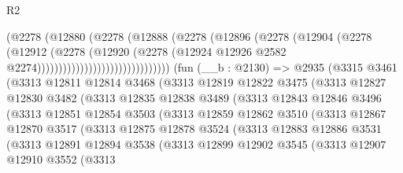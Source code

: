 \begin{lexlean}{R2}
\begin{coremodule}
                                      (@2278
                                        (@12880
                                          (@2278
                                            (@12888
                                              (@2278
                                                (@12896
                                                  (@2278
                                                    (@12904
                                                      (@2278
                                                        (@12912
                                                          (@2278
                                                            (@12920
                                                              (@2278
                                                                (@12924
                                                                  @12926
                                                                  @2582
                                                                  @2274)))))))))))))))))))))))))))))))
    (fun (__b : @2130) =>
    @2935
      (@3315
        @3461
        (@3313
          @12811
          @12814
          @3468
          (@3313
            @12819
            @12822
            @3475
            (@3313
              @12827
              @12830
              @3482
              (@3313
                @12835
                @12838
                @3489
                (@3313
                  @12843
                  @12846
                  @3496
                  (@3313
                    @12851
                    @12854
                    @3503
                    (@3313
                      @12859
                      @12862
                      @3510
                      (@3313
                        @12867
                        @12870
                        @3517
                        (@3313
                          @12875
                          @12878
                          @3524
                          (@3313
                            @12883
                            @12886
                            @3531
                            (@3313
                              @12891
                              @12894
                              @3538
                              (@3313
                                @12899
                                @12902
                                @3545
                                (@3313
                                  @12907
                                  @12910
                                  @3552
                                  (@3313

\end{coremodule}
\end{lexlean}
